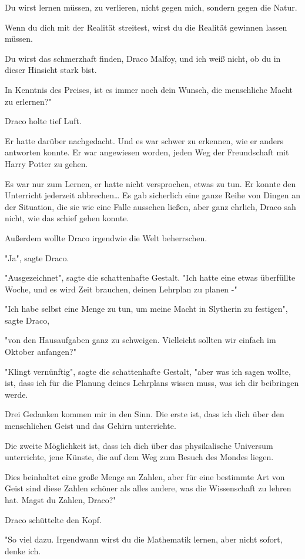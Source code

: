 {Du wirst lernen müssen, zu verlieren, nicht gegen mich, sondern gegen die Natur.

Wenn du dich mit der Realität streitest, wirst du die Realität gewinnen lassen müssen.

Du wirst das schmerzhaft finden, Draco Malfoy, und ich weiß nicht, ob du in dieser Hinsicht stark bist.

In Kenntnis des Preises, ist es immer noch dein Wunsch, die menschliche Macht zu erlernen?"

Draco holte tief Luft.

Er hatte darüber nachgedacht. Und es war schwer zu erkennen, wie er anders antworten konnte. Er war angewiesen worden, jeden Weg der Freundschaft mit Harry Potter zu gehen.

Es war nur zum Lernen, er hatte nicht versprochen, etwas zu tun. Er konnte den Unterricht jederzeit abbrechen… Es gab sicherlich eine ganze Reihe von Dingen an der Situation, die sie wie eine Falle aussehen ließen, aber ganz ehrlich, Draco sah nicht, wie das schief gehen konnte.

Außerdem wollte Draco irgendwie die Welt beherrschen.

"Ja", sagte Draco.

"Ausgezeichnet", sagte die schattenhafte Gestalt. "Ich hatte eine etwas überfüllte Woche, und es wird Zeit brauchen, deinen Lehrplan zu planen -"

"Ich habe selbst eine Menge zu tun, um meine Macht in Slytherin zu festigen", sagte Draco,

"von den Hausaufgaben ganz zu schweigen. Vielleicht sollten wir einfach im Oktober anfangen?"

"Klingt vernünftig", sagte die schattenhafte Gestalt, "aber was ich sagen wollte, ist, dass ich für die Planung deines Lehrplans wissen muss, was ich dir beibringen werde.

Drei Gedanken kommen mir in den Sinn. Die erste ist, dass ich dich über den menschlichen Geist und das Gehirn unterrichte.

Die zweite Möglichkeit ist, dass ich dich über das physikalische Universum unterrichte, jene Künste, die auf dem Weg zum Besuch des Mondes liegen.

Dies beinhaltet eine große Menge an Zahlen, aber für eine bestimmte Art von Geist sind diese Zahlen schöner als alles andere, was die Wissenschaft zu lehren hat. Magst du Zahlen, Draco?"

Draco schüttelte den Kopf.

"So viel dazu. Irgendwann wirst du die Mathematik lernen, aber nicht sofort, denke ich.

}
